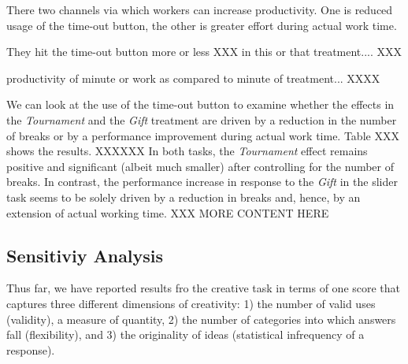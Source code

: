 There two channels via which workers can increase productivity. One is 
reduced usage of the time-out button, the other is greater effort during actual work time. 

They hit the time-out button more or less XXX in this or that treatment.... XXX

productivity of minute or work as compared to minute of treatment... XXXX


We can look at the use of the time-out button to 
examine whether the effects in the \textit{Tournament}
 and the \textit{Gift} treatment are driven by a reduction in the number of breaks or by a 
performance improvement during actual work time. Table XXX shows the results. XXXXXX 
In both tasks, the \textit{Tournament} effect remains 
positive and significant (albeit much smaller)  after controlling for the number of breaks. 
In contrast, the performance increase in response to the \textit{Gift} in the slider
 task seems to be solely driven by a reduction in breaks and, hence, by an extension of actual working time. XXX MORE CONTENT HERE



\subsection{Sensitiviy Analysis}

Thus far, we have reported results fro the creative task in terms of one score that captures three different dimensions of creativity: 
1) the 
number of valid uses (validity), a measure of quantity, 2) the number of categories into which answers fall (flexibility), and 3) the originality of ideas (statistical infrequency of a response). 

